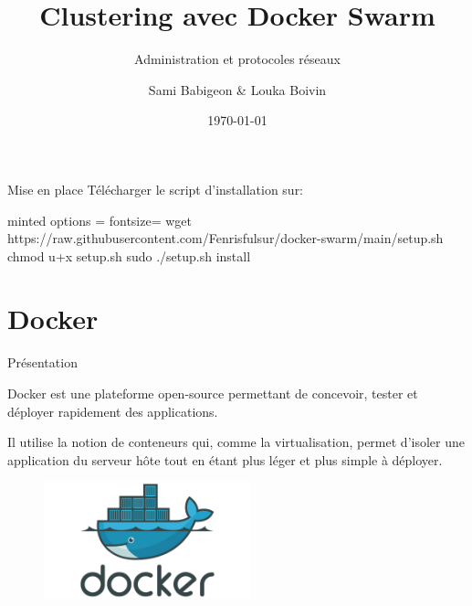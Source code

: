 \documentclass{cubeamer}
\title{Clustering avec Docker Swarm}
\subtitle{Administration et protocoles réseaux}
\author[Sami Babigeon \& Louka Boivin]{Sami Babigeon \& Louka Boivin}
\date{\today}
\institute[Université de Rouen]{Master 2 SSI}
\begin{document}

\maketitle

\begin{frame}[fragile]{Mise en place}
Télécharger le script d'installation sur:
\begin{bashWithOption}{minted options = {fontsize=\footnotesize}}
wget https://raw.githubusercontent.com/Fenrisfulsur/docker-swarm/main/setup.sh     
chmod u+x setup.sh
sudo ./setup.sh install
\end{bashWithOption}
\end{frame}

\cutoc

\section{Docker}

\begin{frame}{Présentation}
    \begin{multicols}{2}
    Docker est une plateforme open-source permettant de concevoir, tester et déployer rapidement
    des applications.
    
    Il utilise la notion de conteneurs qui, comme la virtualisation,
    permet d'isoler une application du serveur hôte tout en étant plus léger et plus simple à
    déployer.

    \columnbreak
    \begin{figure}
        \centering
        \includegraphics[width=6cm]{img/docker}
    \end{figure}    

    \end{multicols}
\end{frame}
\end{document}
